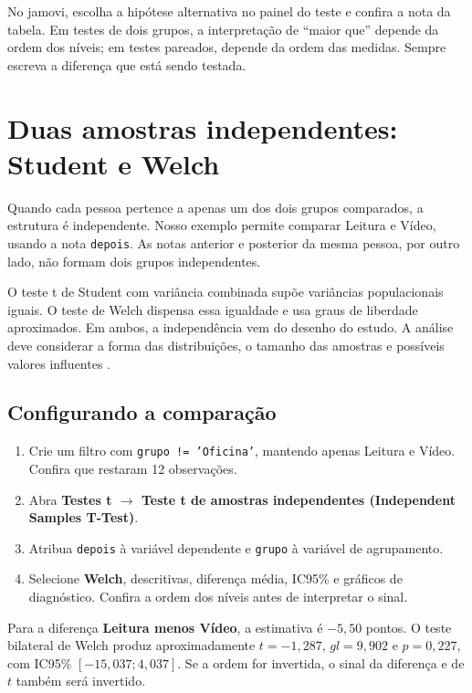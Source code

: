 No jamovi, escolha a hipótese alternativa no painel do teste e confira a nota da tabela. Em testes de dois grupos, a interpretação de ``maior que'' depende da ordem dos níveis; em testes pareados, depende da ordem das medidas. Sempre escreva a diferença que está sendo testada.

\section{Duas amostras independentes: Student e Welch}

Quando cada pessoa pertence a apenas um dos dois grupos comparados, a estrutura é independente. Nosso exemplo permite comparar Leitura e Vídeo, usando a nota \texttt{depois}. As notas anterior e posterior da mesma pessoa, por outro lado, não formam dois grupos independentes.

O teste t de Student com variância combinada supõe variâncias populacionais iguais. O teste de Welch dispensa essa igualdade e usa graus de liberdade aproximados. Em ambos, a independência vem do desenho do estudo. A análise deve considerar a forma das distribuições, o tamanho das amostras e possíveis valores influentes \parencite{NISTTesteT,JamoviTIndependente}.

\subsection{Configurando a comparação}

\begin{enumerate}
  \item Crie um filtro com \texttt{grupo != 'Oficina'}, mantendo apenas Leitura e Vídeo. Confira que restaram 12 observações.
  \item Abra \textbf{Testes t $\rightarrow$ Teste t de amostras independentes (Independent Samples T-Test)}.
  \item Atribua \texttt{depois} à variável dependente e \texttt{grupo} à variável de agrupamento.
  \item Selecione \textbf{Welch}, descritivas, diferença média, IC95\% e gráficos de diagnóstico. Confira a ordem dos níveis antes de interpretar o sinal.
\end{enumerate}

Para a diferença \textbf{Leitura menos Vídeo}, a estimativa é $-5{,}50$ pontos. O teste bilateral de Welch produz aproximadamente $t=-1{,}287$, $gl=9{,}902$ e $p=0{,}227$, com IC95\% $[-15{,}037;4{,}037]$. Se a ordem for invertida, o sinal da diferença e de $t$ também será invertido.

